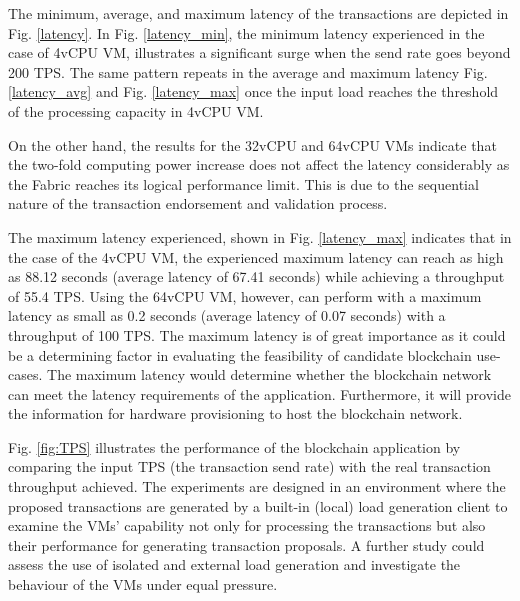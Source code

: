 \documentclass[conference]{IEEEtran}
\begin{document}
The minimum, average, and maximum latency of the transactions are depicted in Fig. \ref{latency}. In Fig. \ref{latency_min}, the minimum latency experienced in the case of 4vCPU VM, illustrates a significant surge when the send rate goes beyond 200 TPS. The same pattern repeats in the average and maximum latency Fig. \ref{latency_avg} and Fig. \ref{latency_max} once the input load reaches the threshold of the processing capacity in 4vCPU VM.




On the other hand, the results for the 32vCPU and 64vCPU VMs indicate that the two-fold computing power increase does not affect the latency considerably as the Fabric reaches its logical performance limit. This is due to the sequential nature of the transaction endorsement and validation process.

The maximum latency experienced, shown in Fig. \ref{latency_max} indicates that in the case of the 4vCPU VM, the experienced maximum latency can reach as high as 88.12 seconds (average latency of 67.41 seconds) while achieving a throughput of 55.4 TPS. Using the 64vCPU VM, however, can perform with a maximum latency as small as 0.2 seconds (average latency of 0.07 seconds) with a throughput of 100 TPS.
The maximum latency is of great importance as it could be a determining factor in evaluating the feasibility of candidate blockchain use-cases. The maximum latency would determine whether the blockchain network can meet the latency requirements of the application. Furthermore, it will provide the information for hardware provisioning to host the blockchain network. 


Fig. \ref{fig:TPS} illustrates the performance of the blockchain application by comparing the input TPS (the transaction send rate) with the real transaction throughput achieved. The experiments are designed in an environment where the proposed transactions are generated by a built-in (local) load generation client to examine the VMs' capability not only for processing the transactions but also their performance for generating transaction proposals. A further study could assess the use of isolated and external load generation and investigate the behaviour of the VMs under equal pressure.
\end{document}
